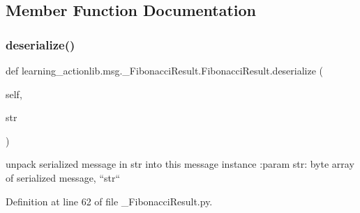 \subsection{Member Function Documentation}
\mbox{\label{classlearning__actionlib_1_1msg_1_1__FibonacciResult_1_1FibonacciResult_af50c6126354ca3ea603bc8c31aa5c9ed}} 
\subsubsection{\texorpdfstring{deserialize()}{deserialize()}}
{\footnotesize\ttfamily def learning\+\_\+actionlib.\+msg.\+\_\+\+Fibonacci\+Result.\+Fibonacci\+Result.\+deserialize (\begin{DoxyParamCaption}\item[{}]{self,  }\item[{}]{str }\end{DoxyParamCaption})}

\begin{DoxyVerb}unpack serialized message in str into this message instance
:param str: byte array of serialized message, ``str``
\end{DoxyVerb}
 

Definition at line 62 of file \+\_\+\+Fibonacci\+Result.\+py.


